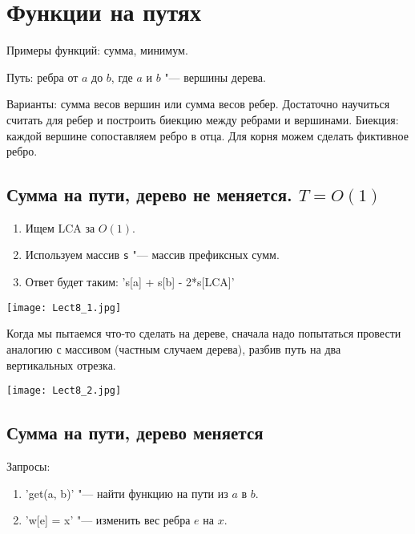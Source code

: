 \chapter{Функции на путях}

Примеры функций: сумма, минимум.

Путь: ребра от $a$ до $b$, где $a$ и $b$ "--- вершины дерева.

Варианты: сумма весов вершин или сумма весов ребер.
Достаточно научиться считать для ребер и построить биекцию между ребрами и вершинами.
Биекция: каждой вершине сопоставляем ребро в отца.
Для корня можем сделать фиктивное ребро.

\section{Сумма на пути, дерево не меняется. $T = O\left(1\right)$}

\begin{enumerate}
	\item Ищем LCA за $O\left(1\right)$.
	\item Используем массив \verb's' "--- массив префиксных сумм.
	\item Ответ будет таким: \cpp's[a] + s[b] - 2*s[LCA]'
\end{enumerate}

\begin{center}
	\texttt{[image: Lect8\_1.jpg]}
\end{center}

\begin{Rem}
	Когда мы пытаемся что-то сделать на дереве, сначала надо попытаться провести аналогию с массивом (частным случаем дерева),
	разбив путь на два вертикальных отрезка.
\end{Rem}

\begin{center}
	\texttt{[image: Lect8\_2.jpg]}
\end{center}

\section{Сумма на пути, дерево меняется}

Запросы:
\begin{enumerate}
	\item \cpp'get(a, b)' "--- найти функцию на пути из $a$ в $b$.
	\item \cpp'w[e] = x' "--- изменить вес ребра $e$ на $x$.
\end{enumerate}

